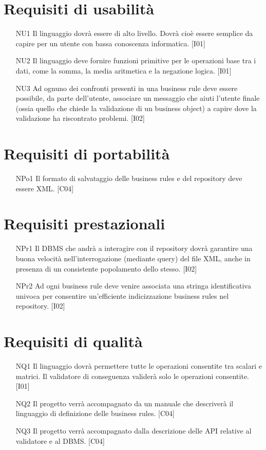 \documentclass[11pt,titlepage,a4paper]{report}
\begin{document}
\section{Requisiti di usabilit\`a}
\begin{itemize}
\item[NU1]{Il linguaggio dovr\`a essere di alto livello. Dovr\`a cio\`e essere semplice da capire per un utente con bassa conoscenza informatica. [I01]}
\item[NU2]{Il linguaggio deve fornire funzioni primitive per le operazioni base tra i dati, come la somma, la media aritmetica e la negazione logica. [I01]}
\item[NU3]{Ad ognuno dei confronti presenti in una business rule deve essere possibile, da parte dell'utente, associare un messaggio che aiuti l'utente finale (ossia quello che chiede la validazione di un business object) a capire dove la validazione ha riscontrato problemi. [I02]}
\end{itemize}

\section{Requisiti di portabilit\`a}
\begin{itemize}
\item[NPo1]{Il formato di salvataggio delle business rules e del repository deve essere XML. [C04]}
\end{itemize}
\section{Requisiti prestazionali}
\begin{itemize}
 \item[NPr1]{Il DBMS che andr\`a a interagire con il repository dovr\`a garantire una buona velocit\`a nell'interrogazione (mediante query) del file XML, anche in presenza di un consistente popolamento dello stesso. [I02]}
\item[NPr2]{Ad ogni business rule deve venire associata una stringa identificativa univoca per consentire un'efficiente indicizzazione business rules nel repository. [I02]}
\end{itemize}

\section{Requisiti di qualit\`a}
\begin{itemize}
\item[NQ1]{Il linguaggio dovr\`a permettere tutte le operazioni consentite tra scalari e matrici. Il validatore di conseguenza valider\`a solo le operazioni consentite. [I01]}
\item[NQ2]{Il progetto verr\`a accompagnato da un manuale che descriver\`a il linguaggio di definizione delle business rules. [C04]}
\item[NQ3]{Il progetto verr\`a accompagnato dalla descrizione delle API relative al validatore e al DBMS. [C04]}
\end{itemize}
\newpage
\end{document}
